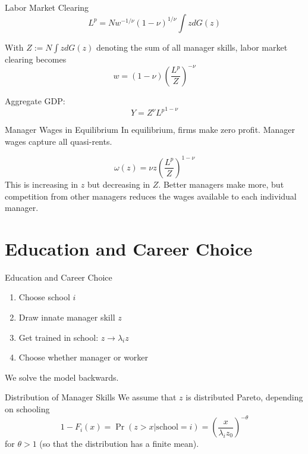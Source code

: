 \documentclass[
  ignorenonframetext,
  aspectratio=1610,
]{beamer}
\providecommand{\tightlist}{%
  \setlength{\itemsep}{0pt}\setlength{\parskip}{0pt}}
\begin{document}
\begin{frame}{Labor Market Clearing}
\protect\hypertarget{labor-market-clearing}{}
\[L^{p} = N w^{-1/\nu}(1-\nu)^{1/\nu}\int z dG(z)\]

With \(Z := N\int z dG(z)\) denoting the sum of all manager skills,
labor market clearing becomes
\[w  = (1-\nu)\left(\frac {L^{p}}{Z}\right)^{-\nu}\]

Aggregate GDP: \[Y = Z^\nu {L^{p}}^{1-\nu}\]
\end{frame}

\begin{frame}{Manager Wages in Equilibrium}
\protect\hypertarget{manager-wages-in-equilibrium}{}
In equilibrium, firms make zero profit. Manager wages capture all
quasi-rents.

\[\omega(z) = \nu z \left(\frac {L^{p}}{Z}\right)^{1-\nu}\] This is
increasing in \(z\) but decreasing in \(Z\). Better managers make more,
but competition from other managers reduces the wages available to each
individual manager.
\end{frame}

\section{Education and Career Choice}\label{education-and-career-choice}

\begin{frame}{Education and Career Choice}
\protect\hypertarget{education-and-career-choice-1}{}
\begin{enumerate}
\tightlist
\item
  Choose school \(i\)
\item
  Draw innate manager skill \(z\)
\item
  Get trained in school: \(z\to\lambda_i z\)
\item
  Choose whether manager or worker
\end{enumerate}

We solve the model backwards.
\end{frame}

\begin{frame}{Distribution of Manager Skills}
\protect\hypertarget{distribution-of-manager-skills}{}
We assume that \(z\) is distributed Pareto, depending on schooling
\[1-F_i(x) = \Pr(z > x|\text{school}=i) = \left(\frac x{\lambda_i z_0}\right)^{-\theta}\]
for \(\theta>1\) (so that the distribution has a finite mean).
\end{frame}
\end{document}
